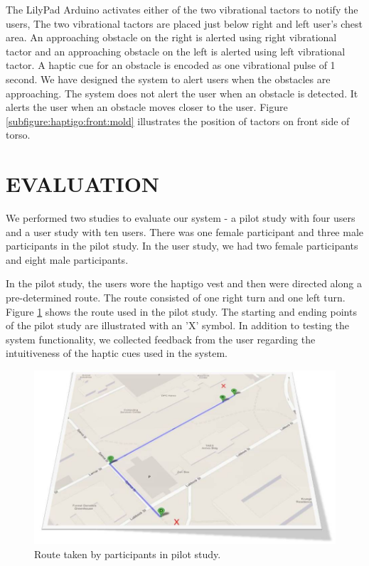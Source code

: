 \documentclass{sigchi}
\begin{document}
The LilyPad Arduino activates either of the two vibrational tactors to notify the users, The two vibrational tactors are placed just below right and left user’s chest area. An approaching obstacle on the right is alerted using right vibrational tactor and an approaching obstacle on the left is alerted using left vibrational tactor. A haptic cue for an obstacle is encoded as one vibrational pulse of 1 second. We have designed the system to alert users when the obstacles are approaching. The system does not alert the user when an obstacle is detected. It alerts the user when an obstacle moves closer to the user. Figure \ref{subfigure:haptigo:front:mold} illustrates the position of tactors on front side of torso.



\section{EVALUATION}
We performed two studies to evaluate our system - a pilot study with four users and a user study with ten users. There was one female participant and three male participants in the pilot study. In the user study, we had two female participants and eight male participants.

In the pilot study, the users wore the haptigo vest and then were directed along a pre-determined route. The route consisted of one right turn and one left turn. Figure \ref{figure:pilot:route} shows the route used in the pilot study. The starting and ending points of the pilot study are illustrated with an 'X' symbol. In addition to testing the system functionality, we collected feedback from the user regarding the intuitiveness of the haptic cues used in the system.

\begin{figure}[ht]
\centering
\includegraphics[width=0.8\columnwidth]{Images/PilotStudyRoute.JPG}
\caption{Route taken by participants in pilot study.}
\label{figure:pilot:route}
\end{figure}
\end{document}
